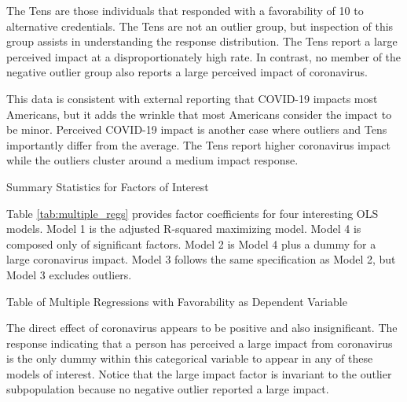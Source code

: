 \documentclass[review]{elsarticle}
\begin{document}
The Tens are those individuals that responded with a favorability of 10 to alternative credentials.
The Tens are not an outlier group, but inspection of this group assists in understanding the response distribution.
The Tens report a large perceived impact at a disproportionately high rate.
In contrast, no member of the negative outlier group also reports a large perceived impact of coronavirus.

This data is consistent with external reporting that COVID-19 impacts most Americans\cite{demographic2020},
but it adds the wrinkle that most Americans consider the impact to be minor.
Perceived COVID-19 impact is another case where outliers and Tens importantly differ from the average.
The Tens report higher coronavirus impact while the outliers cluster around a medium impact response.

\begin{table}
    \caption{Summary Statistics for Factors of Interest}
    \resizebox{\columnwidth}{!}{
        
    }
    \label{tab:desc_stats}
\end{table}

Table \ref{tab:multiple_regs} provides factor coefficients for four interesting OLS models.
Model 1 is the adjusted R-squared maximizing model.
Model 4 is composed only of significant factors.
Model 2 is Model 4 plus a dummy for a large coronavirus impact.
Model 3 follows the same specification as Model 2, but Model 3 excludes outliers.

\begin{table}
    \caption{Table of Multiple Regressions with Favorability as Dependent Variable}
    \resizebox{\columnwidth}{!}{
        
    }
    \label{tab:multiple_regs}
\end{table}

The direct effect of coronavirus appears to be positive and also insignificant.
The response indicating that a person has perceived a large impact from coronavirus is the only dummy
within this categorical variable to appear in any of these models of interest.
Notice that the large impact factor is invariant to the outlier subpopulation
because no negative outlier reported a large impact.
\end{document}
